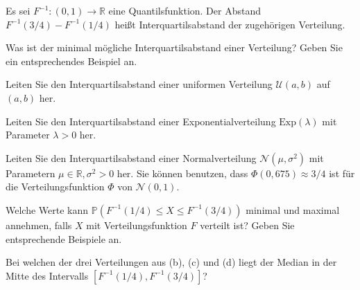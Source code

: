 \begin{Problem}
	Es sei $F^{-1} : (0, 1) \to \mathbb{R}$ eine Quantilsfunktion. Der Abstand $F^{-1}(3/4) - F^{-1}(1/4)$ heißt Interquartilsabstand der zugehörigen Verteilung.
	
	\begin{parts}
		\item Was ist der minimal mögliche Interquartilsabstand einer Verteilung? Geben Sie ein entsprechendes Beispiel an.
		\item Leiten Sie den Interquartilsabstand einer uniformen Verteilung $\mathcal{U}(a, b)$ auf $(a, b)$ her.
		\item Leiten Sie den Interquartilsabstand einer Exponentialverteilung $\text{Exp}(\lambda)$ mit Parameter $\lambda > 0$ her.
		\item Leiten Sie den Interquartilsabstand einer Normalverteilung $\mathcal{N}(\mu, \sigma^2)$ mit Parametern $\mu \in \mathbb{R}, \sigma^2 > 0$ her. Sie können benutzen, dass $\Phi(0{,}675) \approx 3/4$ ist für die Verteilungsfunktion $\Phi$ von $\mathcal{N}(0, 1)$.
		\item Welche Werte kann $\mathbb{P}(F^{-1}(1/4) \leq X \leq F^{-1}(3/4))$ minimal und maximal annehmen, falls $X$ mit Verteilungsfunktion $F$ verteilt ist? Geben Sie entsprechende Beispiele an.
		\item Bei welchen der drei Verteilungen aus (b), (c) und (d) liegt der Median in der Mitte des Intervalls $[F^{-1}(1/4), F^{-1}(3/4)]$?
	\end{parts}
	\end{Problem}
